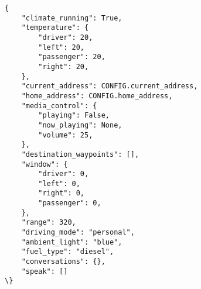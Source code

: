 \begin{lstlisting}[caption={[State of the Studied Cyber-Physical System]The car state on which the language agent operates, reproduced partially here. The values of the attributes are in well-defined ranges. Some properties are available to the agent as read only, allowing conditional queries such as "find the closest fueling station", which depends on the type of fuel powering the car. A full discussion of the properties available to the language agent is present in Appendix \ref{car-state-appendix}.},captionpos=b]
 {
    "climate_running": True,
    "temperature": {
        "driver": 20,
        "left": 20,
        "passenger": 20,
        "right": 20,
    },
    "current_address": CONFIG.current_address,
    "home_address": CONFIG.home_address,
    "media_control": {
        "playing": False,
        "now_playing": None,
        "volume": 25,
    },
    "destination_waypoints": [],
    "window": {
        "driver": 0,
        "left": 0,
        "right": 0,
        "passenger": 0,
    },
    "range": 320,
    "driving_mode": "personal",
    "ambient_light": "blue",
    "fuel_type": "diesel",
    "conversations": {},
    "speak": []
\}
\end{lstlisting}